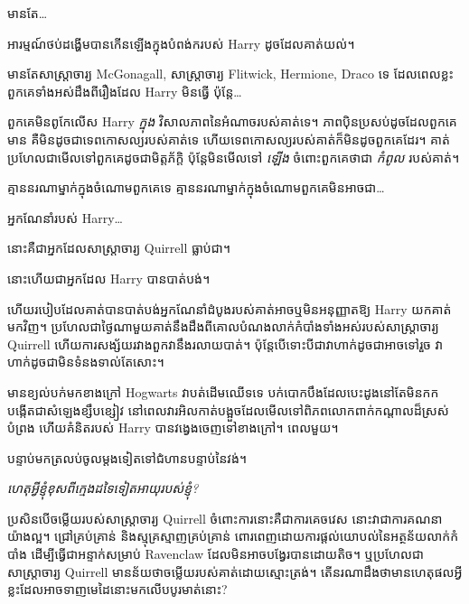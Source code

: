 {{{{{{{មានតែ…

អារម្មណ៍​ថប់​ដង្ហើម​បាន​កើន​ឡើង​ក្នុង​បំពង់ក​របស់ Harry ដូចដែល​គាត់​យល់។

មានតែសាស្ត្រាចារ្យ McGonagall, សាស្រ្តាចារ្យ Flitwick, Hermione, Draco ទេ ដែលពេលខ្លះពួកគេទាំងអស់ដឹងពីរឿងដែល Harry មិនធ្វើ ប៉ុន្តែ…

ពួកគេមិនពូកែលើស Harry \emph{ក្នុង} វិសាលភាពនៃអំណាចរបស់គាត់ទេ។ ភាពប៉ិនប្រសប់ដូចដែលពួកគេមាន គឺមិនដូចជាទេពកោសល្យរបស់គាត់ទេ ហើយទេពកោសល្យរបស់គាត់ក៏មិនដូចពួកគេដែរ។ គាត់ប្រហែលជាមើលទៅពួកគេដូចជាមិត្តភ័ក្តិ ប៉ុន្តែមិនមើលទៅ \emph{ឡើង} ចំពោះពួកគេថាជា \emph{កំពូល} របស់គាត់។

គ្មាននរណាម្នាក់ក្នុងចំណោមពួកគេទេ គ្មាននរណាម្នាក់ក្នុងចំណោមពួកគេមិនអាចជា…

អ្នកណែនាំរបស់ Harry…

នោះគឺជាអ្នកដែលសាស្រ្តាចារ្យ Quirrell ធ្លាប់ជា។

នោះហើយជាអ្នកដែល Harry បានបាត់បង់។

ហើយ​របៀប​ដែល​គាត់​បាន​បាត់​បង់​អ្នក​ណែនាំ​ដំបូង​របស់​គាត់​អាច​ឬ​មិន​អនុញ្ញាត​ឱ្យ Harry យក​គាត់​មក​វិញ។ ប្រហែលជាថ្ងៃណាមួយគាត់នឹងដឹងពីគោលបំណងលាក់កំបាំងទាំងអស់របស់សាស្រ្តាចារ្យ Quirrell ហើយការសង្ស័យរវាងពួកវានឹងរលាយបាត់។ ប៉ុន្តែ​បើ​ទោះ​បី​ជា​វា​ហាក់​ដូច​ជា​អាច​ទៅ​រួច វា​ហាក់​ដូច​ជា​មិន​ទំនង​ទាល់​តែ​សោះ។

មានខ្យល់បក់មកខាងក្រៅ Hogwarts វាបត់ដើមឈើទទេ បក់បោកបឹងដែលបេះដូងនៅតែមិនកក បង្កើតជាសំឡេងខ្សឹបខ្សៀវ នៅពេលវារអិលកាត់បង្អួចដែលមើលទៅពិភពលោកពាក់កណ្តាលដ៏ស្រស់បំព្រង ហើយគំនិតរបស់ Harry បានវង្វេងចេញទៅខាងក្រៅ។ ពេលមួយ។

បន្ទាប់មកត្រលប់ចូលម្តងទៀតទៅជំហានបន្ទាប់នៃវង់។

\emph{ហេតុអ្វីខ្ញុំខុសពីក្មេងដទៃទៀតអាយុរបស់ខ្ញុំ?}

ប្រសិនបើចម្លើយរបស់សាស្រ្តាចារ្យ Quirrell ចំពោះការនោះគឺជាការគេចវេស នោះវាជាការគណនាយ៉ាងល្អ។ ជ្រៅគ្រប់គ្រាន់ និងស្មុគ្រស្មាញគ្រប់គ្រាន់ ពោរពេញដោយការផ្ដល់យោបល់នៃអត្ថន័យលាក់កំបាំង ដើម្បីធ្វើជាអន្ទាក់សម្រាប់ Ravenclaw ដែលមិនអាចបង្វែរបានដោយតិច។ ឬប្រហែលជាសាស្រ្តាចារ្យ Quirrell មានន័យថាចម្លើយរបស់គាត់ដោយស្មោះត្រង់។ តើ​នរណា​ដឹង​ថា​មាន​ហេតុផល​អ្វី​ខ្លះ​ដែល​អាច​ទាញ​មេដៃ​នោះ​មក​លើ​បបូរមាត់​នោះ?

}}}}}}}
